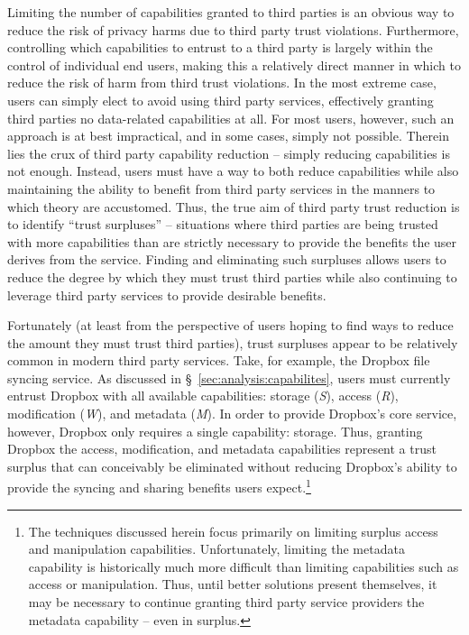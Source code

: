 Limiting the number of capabilities granted to third parties is an
obvious way to reduce the risk of privacy harms due to third party
trust violations. Furthermore, controlling which capabilities to
entrust to a third party is largely within the control of individual
end users, making this a relatively direct manner in which to reduce
the risk of harm from third trust violations. In the most extreme
case, users can simply elect to avoid using third party services,
effectively granting third parties no data-related capabilities at
all. For most users, however, such an approach is at best impractical,
and in some cases, simply not possible. Therein lies the crux of third
party capability reduction -- simply reducing capabilities is not
enough. Instead, users must have a way to both reduce capabilities
while also maintaining the ability to benefit from third party
services in the manners to which theory are accustomed. Thus, the true
aim of third party trust reduction is to identify ``trust surpluses''
-- situations where third parties are being trusted with more
capabilities than are strictly necessary to provide the benefits the
user derives from the service. Finding and eliminating such surpluses
allows users to reduce the degree by which they must trust third
parties while also continuing to leverage third party services to
provide desirable benefits.

Fortunately (at least from the perspective of users hoping to find
ways to reduce the amount they must trust third parties), trust
surpluses appear to be relatively common in modern third party
services. Take, for example, the Dropbox file syncing service. As
discussed in \S~\ref{sec:analysis:capabilites}, users must currently
entrust Dropbox with all available capabilities: storage (\emph{S}),
access (\emph{R}), modification (\emph{W}), and metadata
(\emph{M}). In order to provide Dropbox's core service, however,
Dropbox only requires a single capability: storage. Thus, granting
Dropbox the access, modification, and metadata capabilities represent
a trust surplus that can conceivably be eliminated without reducing
Dropbox's ability to provide the syncing and sharing benefits users
expect.\footnote{The techniques discussed herein focus primarily on
  limiting surplus access and manipulation
  capabilities. Unfortunately, limiting the metadata capability is
  historically much more difficult than limiting capabilities such as
  access or manipulation. Thus, until better solutions present
  themselves, it may be necessary to continue granting third party
  service providers the metadata capability -- even in surplus.}

